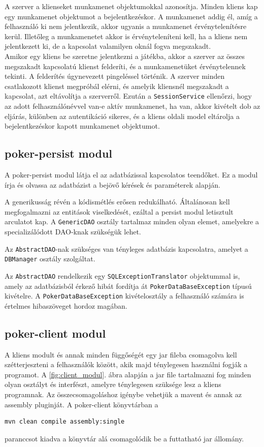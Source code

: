 A szerver a klienseket munkamenet objektumokkal azonosítja. Minden kliens kap egy munkamenet objektumot a bejelentkezéskor. A munkamenet addig él, amíg a felhasználó ki nem jelentkezik, akkor ugyanis a munkamenet érvénytelenítésre kerül. Illetőleg a munkamenetet akkor is érvényteleníteni kell, ha a kliens nem jelentkezett ki, de a kapcsolat valamilyen oknál fogva megszakadt. \\
Amikor egy kliens be szeretne jelentkezni a játékba, akkor a szerver az összes megszakadt kapcsolatú klienst felderíti, és a munkamenetüket érvénytelennek tekinti. A felderítés úgynevezett pingeléssel történik. A szerver minden csatlakozott klienst megpróbál elérni, és amelyik kliensnél megszakadt a kapcsolat, azt eltávolítja a szerverről. Ezután a \texttt{SessionService} ellenőrzi, hogy az adott felhasználónévvel van-e aktív munkamenet, ha van, akkor kivételt dob az eljárás, különben az autentikáció sikeres, és a kliens oldali model eltárolja a bejelentkezéskor kapott munkamenet objektumot.

\subsection{poker-persist modul}
A poker-persist modul látja el az adatbázissal kapcsolatos teendőket. Ez a modul írja és olvassa az adatbázist a bejövő kérések és paraméterek alapján.

A generikusság révén a kódismétlés erősen redukálható. Általánosan kell megfogalmazni az entitások viselkedését, ezáltal a persist modul letisztult arculatot kap. A \texttt{GenericDAO} osztály tartalmaz minden olyan elemet, amelyekre a specializálódott DAO-knak szükségük lehet.

Az \texttt{AbstractDAO}-nak szükséges van tényleges adatbázis kapcsolatra, amelyet a \texttt{DBManager} osztály szolgáltat.

Az \texttt{AbstractDAO} rendelkezik egy \texttt{SQLExceptionTranslator} objektummal is, amely az adatbázisból érkező hibát fordítja át \texttt{PokerDataBaseException} típusú kivételre. A \texttt{PokerDataBaseException} kivételosztály a felhasználó számára is értelmes hibaszöveget hordoz magában.

\subsection{poker-client modul}
A kliens modult és annak minden függőségét egy jar fileba csomagolva kell szétterjeszteni a felhasználók között, akik majd ténylegesen használni fogják a programot. A \ref{fig:client_modul}. ábra alapján a jar file tartalmazni fog minden olyan osztályt és interfészt, amelyre ténylegesen szüksége lesz a kliens programnak. Az összecsomagoláshoz igénybe vehetjük a mavent és annak az assembly pluginját. A poker-client könyvtárban a
 \begin{Verbatim}[xleftmargin=.5in]
mvn clean compile assembly:single
\end{Verbatim}
paranccsot kiadva a  könyvtár alá csomagolódik be a futtatható jar állomány.

